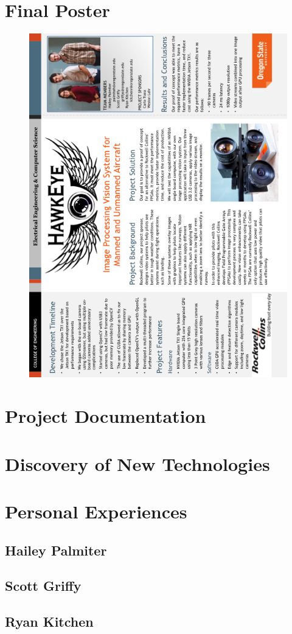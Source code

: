 \documentclass[letterpaper, onecolumn,10pt,draftclsnofoot]{IEEEtran}
\begin{document}
\newpage	
\section{Final Poster}
\begin{figure}[H] 
	\centering
	\includegraphics[width=\textwidth,height=\textheight,keepaspectratio]{images/HawkEye_Poster.png}  
	\end{figure}

\section{Project Documentation}

\section{Discovery of New Technologies}

\section{Personal Experiences}

	\subsection{Hailey Palmiter}
	
	\subsection{Scott Griffy}
	
	\subsection{Ryan Kitchen}
	
   
\end{document}
